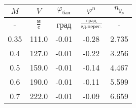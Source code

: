 \begin{tabular}{|c|c|c|c|c|}
\hline
$M$ & $V$ & $\varphi_{бал}$ & $\varphi^{n}$ & $n_{y_{p}}$ \\ 
\hline
- & $\frac{м}{с}$ & град & $\frac{град}{ед.перег.}$ & - \\ 
\hline
0.35 & 111.0 & -0.01 & -0.28 & 2.735 \\ 
\hline
0.4 & 127.0 & -0.01 & -0.22 & 3.256 \\ 
\hline
0.5 & 159.0 & -0.01 & -0.14 & 4.467 \\ 
\hline
0.6 & 190.0 & -0.01 & -0.11 & 5.599 \\ 
\hline
0.7 & 222.0 & -0.01 & -0.09 & 6.659 \\ 
\hline
\end{tabular}
